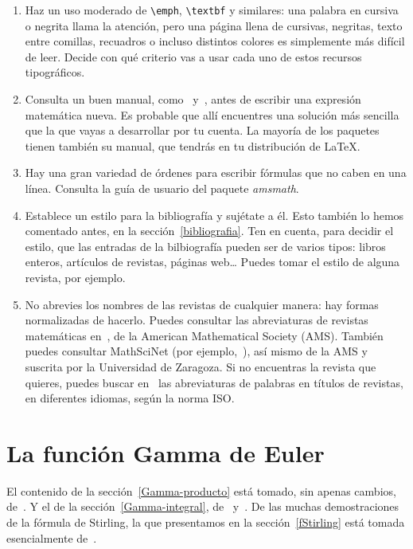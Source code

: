 \documentclass[11pt]{book}
\newcommand{\clearemptydoublepage}{\newpage{\pagestyle{empty}\cleardoublepage}}
\theoremstyle{plain} %
\theoremstyle{definition} %
\begin{document}
\begin{enumerate}
\item Haz un uso moderado de \verb"\emph", \verb"\textbf" y similares: una 
palabra en cursiva o negrita llama la atención, pero 
una página llena de cursivas, negritas, texto entre comillas, recuadros o incluso 
distintos colores es simplemente más difícil de leer. Decide con qué criterio vas 
a usar cada uno de estos recursos tipográficos.

\item Consulta un buen manual, como~\cite{CLMPS} y~\cite{MGBCR}, antes de escribir una expresión matemática nueva. Es probable que allí 
encuentres una solución más sencilla que la que vayas a desarrollar por tu 
cuenta. La mayoría de los paquetes tienen también su manual, que tendrás en tu 
distribución de {\LaTeX}.

\item Hay una gran variedad de órdenes para escribir fórmulas que no caben en una 
línea. Consulta la guía de 
usuario del paquete \emph{amsmath}.

\item Establece un estilo para la bibliografía y sujétate a 
él. Esto también lo hemos comentado antes, en la sección~\ref{bibliografia}. Ten 
en cuenta, para decidir el estilo, que las entradas de la bilbiografía pueden ser 
de varios tipos: libros enteros, artículos de revistas, páginas web{\dots} Puedes 
tomar el estilo de alguna revista, por ejemplo.

\item No abrevies los nombres de las revistas de cualquier manera: hay formas 
normalizadas de hacerlo. Puedes consultar las abreviaturas de revistas 
matemáticas en~\cite{A}, de la American 
Mathematical Society (AMS). También puedes consultar MathSciNet (por 
ejemplo,~\cite{A2}), así mismo de la AMS y suscrita por la Universidad de 
Zaragoza. Si no encuentras la revista que quieres, puedes buscar en~\cite{I} las 
abreviaturas de palabras en títulos de revistas, en diferentes idiomas, según la 
norma ISO.
\end{enumerate}

\clearemptydoublepage

\chapter{La función Gamma de Euler}

El contenido de la sección~\ref{Gamma-producto} está tomado, sin apenas cambios, 
de~\cite[pág.~518 y sig.]{BC}. Y el de la sección~\ref{Gamma-integral}, 
de~\cite[pág.~185--187]{C} y~\cite[pág.~206 y sig.]{W}. De las muchas 
demostraciones de la fórmula de Stirling, la que presentamos en la 
sección~\ref{fStirling} está tomada esencialmente de~\cite{P}.
\end{document}
